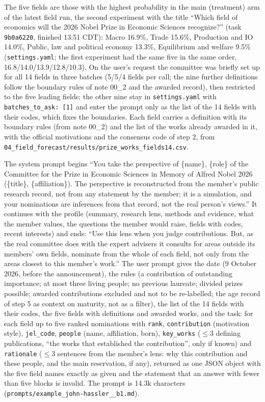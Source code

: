 \documentclass[11pt,a4paper]{article}
\newcommand{\code}[1]{\texttt{#1}}
\begin{document}
The five fields are those with the highest probability in the main (treatment) arm of the latest field run, the
second experiment with the title ``Which field of economics will the 2026 Nobel Prize in Economic Sciences recognize?''
(task \code{9b0a6220}, finished 13:51 CDT): Macro 16.9\%, Trade 15.6\%, Production and IO 14.0\%, Public, law and
political economy 13.3\%, Equilibrium and welfare 9.5\% (\code{settings.yaml}; the first experiment had the same five
in the same order, 16.8/14.0/13.9/12.8/10.3). On the user's request the committee was briefly set up for all 14 fields
in three batches (5/5/4 fields per call; the nine further definitions follow the boundary rules of note 00\_2 and the
awarded record), then restricted to the five leading fields; the other nine stay in \code{settings.yaml} with
\code{batches\_to\_ask: [1]} and enter the prompt only as the list of the 14 fields with their codes, which fixes the
boundaries. Each field carries a definition with its boundary rules (from note 00\_2) and the list of the
works already awarded in it, with the official motivations and the consensus code of step 2, from
\code{04\_field\_forecast/results/prize\_works\_fields14.csv}.

The system prompt begins ``You take the perspective of \{name\}, \{role\} of the Committee for the Prize in Economic
Sciences in Memory of Alfred Nobel 2026 (\{title\}, \{affiliation\}). The perspective is reconstructed from the
member's public research record, not from any statement by the member; it is a simulation, and your nominations are
inferences from that record, not the real person's views.'' It continues with the profile (summary, research lens,
methods and evidence, what the member values, the questions the member would raise, fields with codes, recent
interests) and ends: ``Use this lens when you judge contributions. But, as the real committee does with the expert
advisers it consults for areas outside its members' own fields, nominate from the whole of each field, not only from
the areas closest to this member's work.'' The user prompt gives the date (9 October 2026, before the announcement),
the rules (a contribution of outstanding importance; at most three living people; no previous laureate; divided prizes
possible; awarded contributions excluded and not to be re-labelled; the age record of step 5 as context on maturity,
not as a filter), the list of the 14 fields with their codes, the five fields with definitions and awarded works, and
the task: for each field up to five ranked nominations with \code{rank}, \code{contribution} (motivation style),
\code{jel\_code}, \code{people} (name, affiliation, born), \code{key\_works} ($\leq 3$ defining publications, ``the
works that established the contribution'', only if known) and \code{rationale} ($\leq 3$ sentences from the member's
lens: why this contribution and these people, and the main reservation, if any), returned as one JSON object with the
five field names exactly as given and the statement that an answer with fewer than five blocks is invalid. The prompt
is 14.3k characters (\code{prompts/example\_john-hassler\_\_b1.md}).
\end{document}
